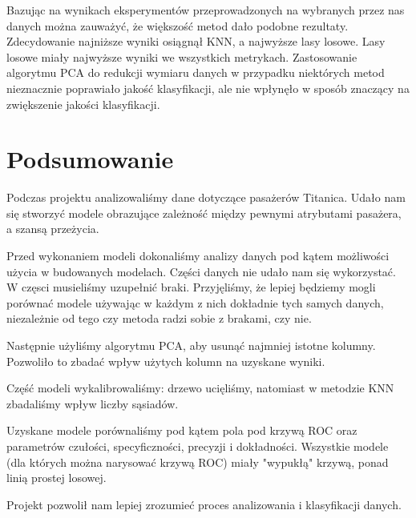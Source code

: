 \documentclass{article}
\begin{document}
Bazując na wynikach eksperymentów przeprowadzonych na wybranych przez nas danych można zauważyć, że większość metod dało podobne rezultaty. Zdecydowanie najniższe wyniki osiągnął KNN, a najwyższe lasy losowe. Lasy losowe miały najwyższe wyniki we wszystkich metrykach. Zastosowanie algorytmu PCA do redukcji wymiaru danych w przypadku niektórych metod nieznacznie poprawiało jakość klasyfikacji, ale nie wpłynęło w sposób znaczący na zwiększenie jakości klasyfikacji. 

\section{Podsumowanie}
Podczas projektu analizowaliśmy dane dotyczące pasażerów Titanica. Udało nam się stworzyć modele obrazujące zależność między pewnymi atrybutami pasażera, a szansą przeżycia.

Przed wykonaniem modeli dokonaliśmy analizy danych pod kątem możliwości użycia w budowanych modelach. Części danych nie udało nam się wykorzystać.
W częsci musieliśmy uzupełnić braki. Przyjęliśmy, że lepiej będziemy mogli porównać modele używając w każdym z nich dokładnie tych samych danych,
niezależnie od tego czy metoda radzi sobie z brakami, czy nie.

Następnie użyliśmy algorytmu PCA, aby usunąć najmniej istotne kolumny. Pozwoliło to zbadać wpływ użytych kolumn na uzyskane wyniki.

Część modeli wykalibrowaliśmy: drzewo ucięliśmy, natomiast w metodzie KNN zbadaliśmy wpływ liczby sąsiadów.

Uzyskane modele porównaliśmy pod kątem pola pod krzywą ROC oraz parametrów czułości, specyficzności, precyzji i dokładności.
Wszystkie modele (dla których można narysować krzywą ROC) miały "wypukłą" krzywą, ponad linią prostej losowej.

Projekt pozwolił nam lepiej zrozumieć proces analizowania i klasyfikacji danych.
\end{document}
